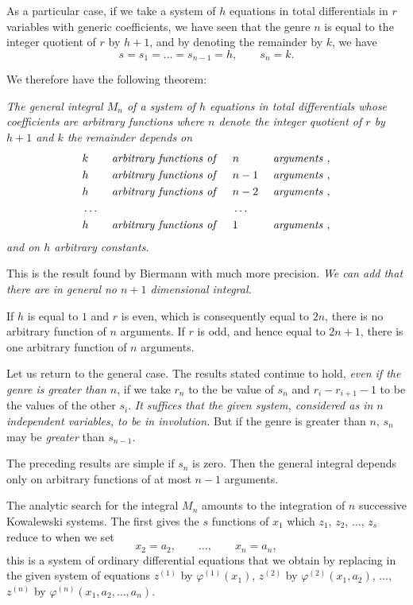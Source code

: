 \documentclass[leqno,11pt]{book}
\makeatletter
\theoremstyle{shape1}
\theoremstyle{shapesmall}
\let\old@phi\phi
\let\old@varphi\varphi
\let\phi\old@varphi
\let\varphi\old@phi
\newcommand{\somespace}{\vspace{9pt}}
\makeatother
\begin{document}
As a particular case, if we take a system of $h$ equations in total differentials in $r$ variables with generic coefficients, we have seen that the genre $n$ is equal to the integer quotient of $r$ by $h+1$, and by denoting the remainder by $k$, we have
\[
s=s_{1}=\dots=s_{n-1}=h,\qquad s_{n}=k.
\]

We therefore have the following theorem:

\somespace

\emph{The general integral $M_{n}$ of a system of $h$ equations in total differentials whose coefficients are arbitrary functions where $n$ denote the integer quotient of $r$ by $h+1$ and $k$ the remainder depends on}
\begin{alignat*}{10}
  &k&&\text{ \emph{arbitrary functions of} }&&n&&\text{ \emph{arguments} },\\
  &h&&\text{ \emph{arbitrary functions of} }&&n-1&&\text{ \emph{arguments} },\\
  &h&&\text{ \emph{arbitrary functions of} }&&n-2&&\text{ \emph{arguments} },\\
  &\dots&&&&\dots\\
  &h&&\text{ \emph{arbitrary functions of} }&&1&&\text{ \emph{arguments} },
\end{alignat*}
\emph{and on $h$ arbitrary constants.}

\somespace

This is the result found by Biermann with much more precision. \emph{We can add that there are in general no $n+1$ dimensional integral.}

If $h$ is equal to $1$ and $r$ is even, which is consequently equal to $2n$, there is no arbitrary function of $n$ arguments. If $r$ is odd, and hence equal to $2n+1$, there is one arbitrary function of $n$ arguments.

Let us return to the general case. The results stated continue to hold, \emph{even if the genre is greater than $n$}, if we take $r_{n}$ to the be value of $s_{n}$ and $r_{i}-r_{i+1}-1$ to be the values of the other $s_{i}$. \emph{It suffices that the given system, considered as in $n$ independent variables, to be in involution.} But if the genre is greater than $n$, $s_{n}$ may be \emph{greater} than $s_{n-1}$.

The preceding results are simple if $s_{n}$ is zero. Then the general integral depends only on arbitrary functions of at most $n-1$ arguments.

The analytic search for the integral $M_{n}$ amounts to the integration of $n$ successive Kowalewski systems. The first gives the $s$ functions of $x_{1}$ which $z_{1}$, $z_{2}$, $\dots$, $z_{s}$ reduce to when we set
\[
x_{2}=a_{2}, \qquad \dots,\qquad x_{n}=a_{n},
\]
this is a system of ordinary differential equations that we obtain by replacing in the given system of equations $z^{(1)}$ by $\phi^{(1)}(x_{1})$, $z^{(2)}$ by $\phi^{(2)}(x_{1},a_{2})$, $\dots$, $z^{(n)}$ by $\phi^{(n)}(x_{1},a_{2},\dots,a_{n})$.
\end{document}
